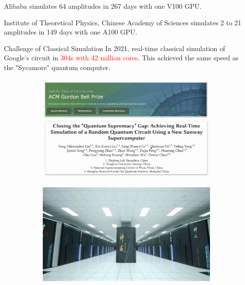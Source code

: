 \documentclass[10pt]{beamer}
\begin{document}
\begin{CJK}{UTF8}{gbsn}
{ Alibaba simulates 64 amplitudes in 267 days with one V100 GPU.

 Institute of Theoretical Physics, Chinese Academy of Sciences simulates 2 to 21 amplitudes in 149 days with one A100 GPU.
}


\begin{frame}[fragile]{Challenge of Classical Simulation}
 In 2021, real-time classical simulation of Google's circuit in \textcolor{red}{304s with 42 million cores}. This achieved the same speed as the "Sycamore" quantum computer.
  \begin{figure}
    \centering
    \begin{subfigure}[b]{0.6\textwidth}
      \includegraphics[width=\textwidth]{fig/google4.png}
    \end{subfigure}
    \hfill
    \begin{subfigure}[b]{0.4\textwidth}
      \includegraphics[width=\textwidth]{fig/google5.png}
    \end{subfigure}
  \end{figure}
\end{frame}
\end{CJK}
\end{document}
